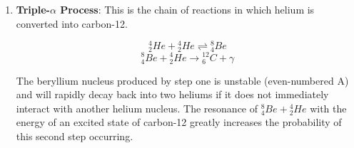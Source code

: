 \begin{enumerate}
 \item \textbf{Triple-$\alpha$ Process}: This is the chain of reactions in which helium is converted into carbon-12.
 
 \begin{equation}
 ^4_2He + \text{}^4_2He \rightleftharpoons \text{}^8_4Be
 \end{equation}
 \begin{equation}
 ^8_4Be + \text{}^4_2He \rightarrow \text{}^{12}_6C + \gamma
 \end{equation}
 
 The beryllium nucleus produced by step one is unstable (even-numbered A) and will rapidly decay back into two heliums if it does not immediately interact with another helium nucleus.  The resonance of $^8_4Be + \text{}^4_2He$ with the energy of an excited state of carbon-12 greatly increases the probability of this second step occurring.
 \end{enumerate}